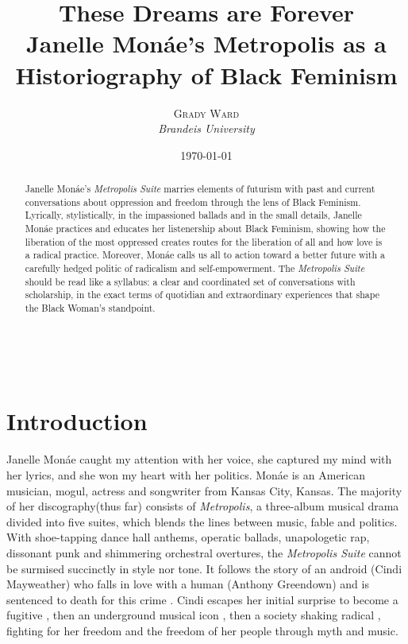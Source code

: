 \documentclass[a4paper, 11pt]{article} %
\title{\linespread{2.1}\textbf{These Dreams are Forever}\\ %
Janelle Mon\'ae's Metropolis as a Historiography of Black Feminism} %
\author{\textsc{Grady Ward} %
\\{\textit{Brandeis University}}} %
\date{\today} %
\makeatletter
\renewcommand{\maketitle}{ %
\begin{flushright} %
	{\LARGE\@title} %

	\vspace{40pt} %

	{\large\@author} %
	\\\@date %

	\vspace{30pt} %
\end{flushright}
}
\makeatother
\begin{document}
\maketitle %


\begin{abstract}

Janelle Mon\'ae's \emph{Metropolis Suite} marries elements of futurism with past and current conversations about oppression and freedom through the lens of Black Feminism.
Lyrically, stylistically, in the impassioned ballads and in the small details, Janelle Mon\'ae practices and educates her listenership about Black Feminism, showing how the liberation of the most oppressed creates routes for the liberation of all and how love is a radical practice.
Moreover, Mon\'ae calls us all to action toward a better future with a carefully hedged politic of radicalism and self-empowerment.
The \emph{Metropolis Suite} should be read like a syllabus: a clear and coordinated set of conversations with scholarship, in the exact terms of quotidian and extraordinary experiences that shape the Black Woman's standpoint.
\end{abstract}

\vspace{30pt}


\section*{Introduction}

Janelle Mon\'ae caught my attention with her voice, she captured my mind with her lyrics, and she won my heart with her politics.
Mon\'ae is an American musician, mogul, actress and songwriter from Kansas City, Kansas.
The majority of her discography(thus far) consists of \emph{Metropolis}, a three-album musical drama divided into five suites, which blends the lines between music, fable and politics.
With shoe-tapping dance hall anthems, operatic ballads, unapologetic rap, dissonant punk and shimmering orchestral overtures, the \emph{Metropolis Suite} cannot be surmised succinctly in style nor tone.
It follows the story of an android (Cindi Mayweather) who falls in love with a human (Anthony Greendown) and is sentenced to death for this crime \cite{wolfmasters}.
Cindi escapes her initial surprise to become a fugitive \cite{manymoons}, then an underground musical icon \cite{favoritefugitive}, then a society shaking radical \cite{fiveseveneighttwoone}, fighting for her freedom and the freedom of her people through myth and music.
\end{document}

